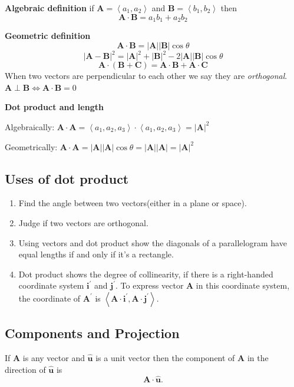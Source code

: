 \documentclass{article}
\newcommand\printvec[1]{\mathbf{#1}}
\newcommand\norm[1]{\mathbf{\left| \printvec{#1} \right|}}
\newcommand\lrangle[1]{\left \langle #1 \right \rangle}
\newcommand\directv{\hat{\mathbf{u}}}
\begin{document}
\textbf{Algebraic definition}
if $\printvec{A} = \lrangle{a_1, a_2}$ and $\printvec{B} = \lrangle{b_1, b_2}$ then
$$\printvec{A} \cdot \printvec{B} = a_1b_1 + a_2b_2$$

\textbf{Geometric definition}
$$\printvec{A} \cdot \printvec{B} = \norm{A}\norm{B}\cos\theta$$
$$\norm{A - B}^2 = \norm{A}^2 + \norm{B}^2 - 2\norm{A}\norm{B}\cos\theta$$
$$\printvec{A} \cdot (\printvec{B} + \printvec{C}) = \printvec{A} \cdot \printvec{B} + \printvec{A} \cdot \printvec{C}$$
When two vectors are perpendicular to each other we say they are \textit{orthogonal}. $\printvec{A} \perp \printvec{B} \Leftrightarrow \printvec{A} \cdot \printvec{B} = 0$

\textbf{Dot product and length}

Algebraically: $\printvec{A} \cdot \printvec{A} = \lrangle{a_1, a_2, a_3} \cdot \lrangle{a_1, a_2, a_3} = \norm{A}^2$

Geometrically: $\printvec{A} \cdot \printvec{A} = \norm{A}\norm{A}\cos\theta = \norm{A}\norm{A} = \norm{A}^2$

\subsection{Uses of dot product}
\begin{enumerate}
  \item Find the angle between two vectors(either in a plane or space).
  \item Judge if two vectors are orthogonal.
  \item Using vectors and dot product show the diagonals of a parallelogram have equal lengths
        if and only if it’s a rectangle.
  \item Dot product shows the degree of collinearity, if there is a right-handed coordinate system $\printvec{i}^\prime$ and $\printvec{j}^\prime$.
        To express vector $\printvec{A}$ in this coordinate system, the coordinate of $\printvec{A}^\prime$ is $\lrangle{\printvec{A} \cdot \printvec{i}^\prime, \printvec{A} \cdot \printvec{j}^\prime}$.
\end{enumerate}

\subsection{Components and Projection}
If $\printvec{A}$ is any vector and $\directv$ is a unit vector then the component of $\printvec{A}$ in the direction of $\directv$ is
$$\printvec{A} \cdot \directv.$$
\end{document}
